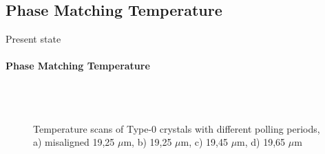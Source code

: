 \documentclass[serif,8pt]{beamer}
\begin{document}
{{\subsection{Phase Matching Temperature}
\begin{frame}{Present state}
	\framesubtitle{Phase Matching Temperature}
	\begin{figure}[!ht]
	  \centering
	  \caption{Temperature scans of Type-0 crystals with different polling periods, a) misaligned 19,25 $\mu$m, b) 19,25 $\mu$m, c) 19,45 $\mu$m, d) 19,65 $\mu$m}
	  \pause
	  \quad
	  \pause
	  \\
	  \quad
	  \\
	  \label{fig:gratings}
	\end{figure}
\end{frame}

}}
\end{document}
